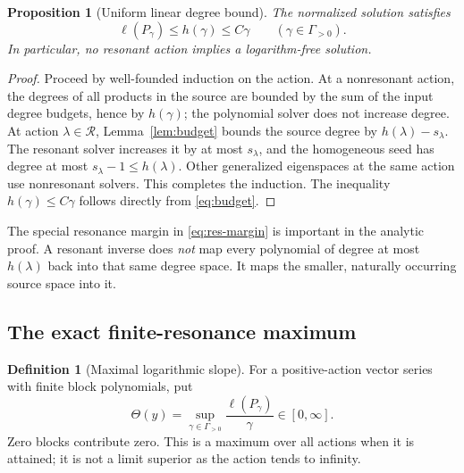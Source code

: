 \documentclass[11pt,a4paper]{article}
\numberwithin{equation}{section}
\newtheorem{proposition}[theorem]{Proposition}
\theoremstyle{definition}
\newtheorem{definition}[theorem]{Definition}
\theoremstyle{remark}
\newcommand{\G}{\Gamma}
\newcommand{\Reson}{\mathcal R}
\begin{document}
\begin{proposition}[Uniform linear degree bound]\label{prop:coarse}
The normalized solution satisfies
\begin{equation}\label{eq:coarse}
 \ell(P_\gamma)\le h(\gamma)\le C\gamma
 \qquad(\gamma\in\G_{>0}).
\end{equation}
In particular, no resonant action implies a logarithm-free solution.
\end{proposition}
\begin{proof}
Proceed by well-founded induction on the action. At a nonresonant
action, the degrees of all products in the source are bounded by the
sum of the input degree budgets, hence by \(h(\gamma)\); the
polynomial solver does not increase degree. At action
\(\lambda\in\Reson\), Lemma~\ref{lem:budget} bounds the source
degree by \(h(\lambda)-s_\lambda\). The resonant solver increases it
by at most \(s_\lambda\), and the homogeneous seed has degree at most
\(s_\lambda-1\le h(\lambda)\). Other generalized eigenspaces at the
same action use nonresonant solvers. This completes the induction.
The inequality \(h(\gamma)\le C\gamma\) follows directly from
\eqref{eq:budget}.
\end{proof}

The special resonance margin in \eqref{eq:res-margin} is important in
the analytic proof. A resonant inverse does \emph{not} map every
polynomial of degree at most \(h(\lambda)\) back into that same degree
space. It maps the smaller, naturally occurring source space into it.

\subsection{The exact finite-resonance maximum}
\begin{definition}[Maximal logarithmic slope]\label{def:slope}
For a positive-action vector series with finite block polynomials, put
\begin{equation}\label{eq:slope-definition}
 \Theta(y)=\sup_{\gamma\in\G_{>0}}
                     \frac{\ell(P_\gamma)}{\gamma}\in[0,\infty].
\end{equation}
Zero blocks contribute zero. This is a maximum over all actions when
it is attained; it is not a limit superior as the action tends to
infinity.
\end{definition}
\end{document}
